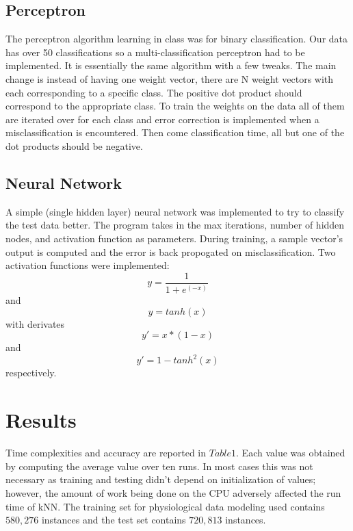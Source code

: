 \documentclass[twoside]{article}
\begin{document}
\begin{multicols}{2}
\subsection{Perceptron}
The perceptron algorithm learning in class was for binary classification. Our data has over 50 classifications so a multi-classification perceptron had to be implemented.  It is essentially the same algorithm with a few tweaks.  The main change is instead of having one weight vector, there are N weight vectors with each corresponding to a specific class.  The positive dot product should correspond to the appropriate class.  To train the weights on the data all of them are iterated over for each class and error correction is implemented when a misclassification is encountered.  Then come classification time, all but one of the dot products should be negative.  

\subsection{Neural Network}
A simple (single hidden layer) neural network was implemented to try to classify the test data better.  The program takes in the max iterations, number of hidden nodes, and activation function as parameters.  During training, a sample vector's output is computed and the error is back propogated on misclassification.  Two activation functions were implemented: 
\begin{equation}
\label{activ1}
y=\frac{1}{1+e^(-x)}
\end{equation}
and 
\begin{equation}
\label{activ2}
y=tanh(x)
\end{equation}
with derivates
\begin{equation}
\label{deriv1}
y'=x*(1-x)
\end{equation}
and 
\begin{equation}
\label{deriv2}
y'=1-tanh^2 (x)
\end{equation}
respectively.

\section{Results}

Time complexities and accuracy are reported in $Table 1$.  Each value was obtained by computing the average value over ten runs.  In most cases this was not necessary as training and testing didn't depend on initialization of values; however, the amount of work being done on the CPU adversely affected the run time of kNN.  The training set for physiological data modeling used contains $580,276$ instances and the test set contains $720,813$ instances.


\end{multicols}
\end{document}
